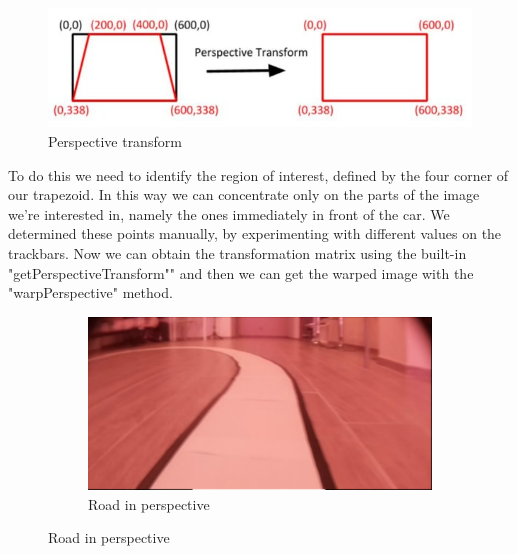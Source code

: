 \documentclass[12pt,a4paper]{article}
\begin{document}
\begin{large}
\begin{figure} [!hb]
  \centering
  \captionsetup{justification=centering}
  \includegraphics{images/perspective_transform.jpg}
  \caption{Perspective transform}
  \end{figure}

To do this we need to identify the region of interest, defined by the four corner of our trapezoid. In this way we can concentrate only on the parts of the image we're interested in, namely the ones immediately in front of the car. We determined these points manually, by experimenting with different values on the trackbars. Now we can obtain the transformation matrix using the built-in "getPerspectiveTransform"" and then we can get the warped image with the "warpPerspective" method.

\begin{figure} [!hbp]
  \centering
    \begin{subfigure}[b]{0.3\textwidth}
    \centering
    \captionsetup{justification=centering}
      \includegraphics[width=\textwidth]{images/camera_perspective.png}
      \caption{Road in perspective}
      

\end{subfigure}
\end{figure}
\end{large}
\end{document}
